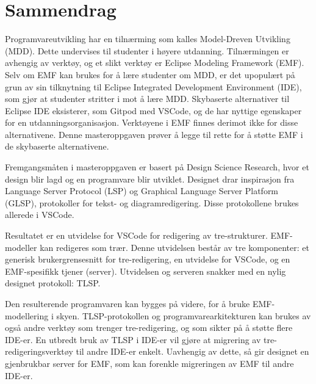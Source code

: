 \chapter*{Sammendrag}

Programvareutvikling har en tilnærming som kalles Model-Dreven Utvikling (MDD).
Dette undervises til studenter i høyere utdanning.
Tilnærmingen er avhengig av verktøy, og et slikt verktøy er Eclipse Modeling Framework (EMF).
Selv om EMF kan brukes for å lære studenter om MDD, er det upopulært på grun av sin tilknytning til Eclipse Integrated Development Environment (IDE), som gjør at studenter stritter i mot å lære MDD.
Skybaserte alternativer til Eclipse IDE eksisterer, som Gitpod med VSCode, og de har nyttige egenskaper for en utdanningsorganisasjon.
Verktøyene i EMF finnes derimot ikke for disse alternativene.
Denne masteroppgaven prøver å legge til rette for å støtte EMF i de skybaserte alternativene.

Fremgangsmåten i masteroppgaven er basert på Design Science Research, hvor et design blir lagd og en programvare blir utviklet.
Designet drar inspirasjon fra Language Server Protocol (LSP) og Graphical Language Server Platform (GLSP), protokoller for tekst- og diagramredigering.
Disse protokollene brukes allerede i VSCode.

Resultatet er en utvidelse for VSCode for redigering av tre-strukturer.
EMF-modeller kan redigeres som trær.
Denne utvidelsen består av tre komponenter: et generisk brukergrensesnitt for tre-redigering, en utvidelse for VSCode, og en EMF-spesifikk tjener (server).
Utvidelsen og serveren snakker med en nylig designet protokoll: \acrfull{TLSP}.

Den resulterende programvaren kan bygges på videre, for å bruke EMF-modellering i skyen.
TLSP-protokollen og programvarearkitekturen kan brukes av også andre verktøy som trenger tre-redigering, og som sikter på å støtte flere IDE-er.
En utbredt bruk av TLSP i IDE-er vil gjøre at migrering av tre-redigeringsverktøy til andre IDE-er enkelt.
Uavhengig av dette, så gir designet en gjenbrukbar server for EMF, som kan forenkle migreringen av EMF til andre IDE-er.